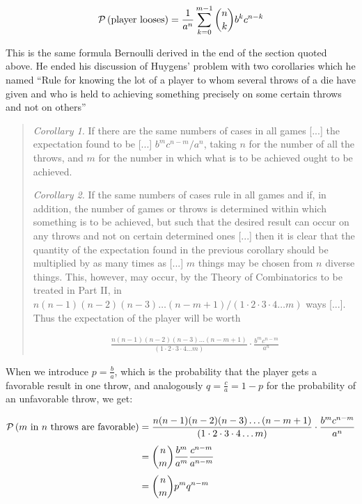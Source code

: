 \begin{align}
  \P{\text{player looses}} = \frac{1}{a^n} \sum_{k=0}^{m-1} \binom nk b^k c^{n-k}
\end{align}

This is the same formula Bernoulli derived in the end of the section quoted above. He ended his discussion of Huygens' problem with two corollaries which he named ``Rule for knowing the lot of a player to whom several throws of a die have given and who is held to achieving something precisely on some certain throws and not on others''~\cite[p. 170]{bernoulli}

\begin{quotation}
  \emph{Corollary 1.} If there are the same numbers of cases in all games [...] the expectation found to be [...] $b^mc^{n-m}/a^n$, taking $n$ for the number of all the throws, and $m$ for the number in which what is to be achieved ought to be achieved.

  \emph{Corollary 2.} If the same numbers of cases rule in all games and if, in addition, the number of games or throws is determined within which something is to be achieved, but such that the desired result can occur on any throws and not on certain determined ones [...] then it is clear that the quantity of the expectation found in the previous corollary should be multiplied by as many times as [...] $m$ things may be chosen from $n$ diverse things. This, however, may occur, by the Theory of Combinatorics to be treated in Part II, in $n(n-1)(n-2)(n-3)\ldots(n-m+1)/(1\cdot 2\cdot 3\cdot 4\ldots m)$ ways [...]. Thus the expectation of the player will be worth

  \begin{align*}
    \frac{n(n-1)(n-2)(n-3)\ldots(n-m+1)}{(1\cdot 2\cdot 3\cdot 4\ldots m)}\cdot \frac{b^mc^{n-m}}{a^n}
  \end{align*}
\end{quotation}

When we introduce $p=\tfrac ba$, which is the probability that the player gets a favorable result in one throw, and analogously $q=\tfrac ca=1-p$ for the probability of an unfavorable throw, we get:

\begin{align}
  \P{\text{$m$ in $n$ throws are favorable}} & = \frac{n(n-1)(n-2)(n-3)\ldots(n-m+1)}{(1\cdot 2\cdot 3\cdot 4\ldots m)}\cdot \frac{b^mc^{n-m}}{a^n} \nl
  &= \binom nm \frac{b^m}{a^m} \frac{c^{n-m}}{a^{n-m}} \nl
  &= \binom nm p^m q^{n-m}
\end{align}


